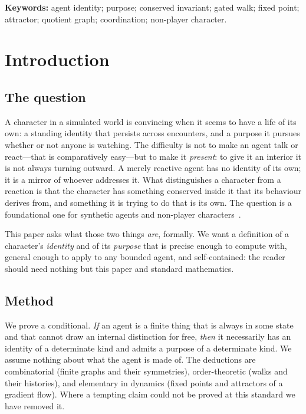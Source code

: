 \documentclass[11pt,twocolumn,a4paper]{article}
\begin{document}
\vspace{0.5em}
\noindent\textbf{Keywords:} agent identity; purpose; conserved invariant;
gated walk; fixed point; attractor; quotient graph; coordination;
non-player character.

\section{Introduction}
\label{sec:intro}

\subsection{The question}

A character in a simulated world is convincing when it seems to have a
life of its own: a standing identity that persists across encounters, and
a purpose it pursues whether or not anyone is watching. The difficulty is
not to make an agent talk or react---that is comparatively easy---but to
make it \emph{present}: to give it an interior it is not always turning
outward. A merely reactive agent has no identity of its own; it is a
mirror of whoever addresses it. What distinguishes a character from a
reaction is that the character has something conserved inside it that its
behaviour derives from, and something it is trying to do that is its own.
The question is a foundational one for synthetic agents and non-player
characters~\cite{russellnorvig2020,simon1996}.

This paper asks what those two things \emph{are}, formally. We want a
definition of a character's \emph{identity} and of its \emph{purpose}
that is precise enough to compute with, general enough to apply to any
bounded agent, and self-contained: the reader should need nothing but
this paper and standard mathematics.

\subsection{Method}

We prove a conditional. \emph{If} an agent is a finite thing that is
always in some state and that cannot draw an internal distinction for
free, \emph{then} it necessarily has an identity of a determinate kind
and admits a purpose of a determinate kind. We assume nothing about what
the agent is made of. The deductions are combinatorial (finite graphs and
their symmetries), order-theoretic (walks and their histories), and
elementary in dynamics (fixed points and attractors of a gradient flow).
Where a tempting claim could not be proved at this standard we have
removed it.
\end{document}
